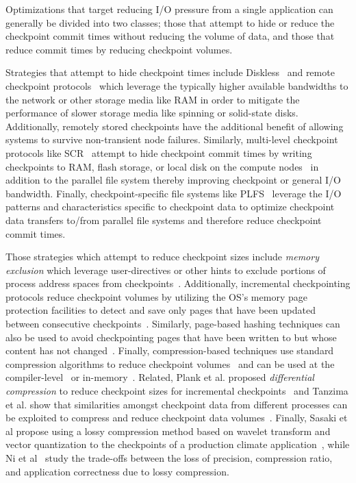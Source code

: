 Optimizations that target reducing I/O pressure from a single application can
generally be divided into two classes; those that attempt to hide or reduce the
checkpoint commit times without reducing the volume of data, and those that
reduce commit times by reducing checkpoint volumes. 

Strategies that attempt to hide checkpoint times include
Diskless~\cite{Plank98Diskless} and remote checkpoint
protocols~\cite{Cornwell11RemoteBLCR,Stellner96CoCheck,Zandy99ProcessHijacking}
which leverage the typically higher available bandwidths to the network or
other storage media like RAM in order to mitigate the performance of slower
storage media like spinning or solid-state disks. Additionally, remotely stored
checkpoints have the additional benefit of allowing systems to survive
non-transient node failures. Similarly, multi-level checkpoint protocols like
SCR~\cite{Moody10SCR,Vaidya95TwoLevel} attempt to hide checkpoint commit times
by writing checkpoints to RAM, flash storage, or local disk on the compute
nodes~\cite{Kougkas2017} in addition to the parallel file system thereby
improving checkpoint or general I/O bandwidth.  Finally, checkpoint-specific
file systems like PLFS~\cite{Bent09PLFS} leverage the I/O patterns and
characteristics specific to checkpoint data to optimize checkpoint data
transfers to/from parallel file systems and therefore reduce checkpoint commit
times.

Those strategies which attempt to reduce checkpoint sizes include \emph{memory
exclusion} which leverage user-directives or other hints to exclude portions of
process address spaces from checkpoints~\cite{Plank99MemoryExclusion}.
Additionally, incremental checkpointing protocols reduce checkpoint volumes by
utilizing the OS's memory page protection facilities to detect and save only
pages that have been updated between consecutive
checkpoints~\cite{Bronevetsky09Compiler,
Chen97CLIP,Elnozahy92ConsistentCheckpointing,Li94ConcurrentCheckpointing,
Plank94Libckpt,Paun10IncrementalWeibull,Kiswany08stdchk}.  Similarly,
page-based hashing techniques can also be used to avoid checkpointing pages
that have been written to but whose content has not
changed~\cite{Ferreira11Libhashckpt}.  Finally, compression-based techniques
use standard compression algorithms to reduce checkpoint
volumes~\cite{Ibtesham12Compression} and can be used at the
compiler-level~\cite{Li90CATCH} or in-memory~\cite{Plank94ICKP}.  Related,
Plank et al. proposed \textit{differential compression} to reduce checkpoint
sizes for incremental checkpoints~\cite{Plank95CompressedDiff} and Tanzima et
al.  show that similarities amongst checkpoint data from different processes
can be exploited to compress and reduce checkpoint data
volumes~\cite{tanzima12mcrengine}.  Finally, Sasaki et al propose using a lossy
compression method based on wavelet transform and vector quantization to the
checkpoints of a production climate application~\cite{sasaki2015}, while Ni et
al~\cite{Ni2014} study the trade-offs between the loss of precision, compression
ratio, and application correctness due to lossy compression.

